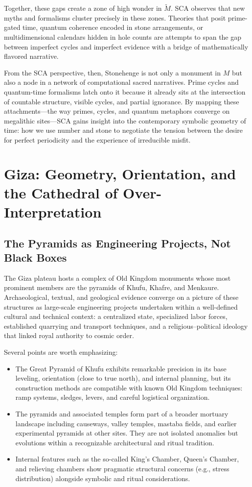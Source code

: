 \documentclass[12]{amsart}
\theoremstyle{plain}
\begin{document}
Together, these gaps create a zone of high wonder in $\tilde M$. SCA observes that new myths and formalisms cluster precisely in these zones. Theories that posit prime-gated time, quantum coherence encoded in stone arrangements, or multidimensional calendars hidden in hole counts are attempts to span the gap between imperfect cycles and imperfect evidence with a bridge of mathematically flavored narrative.

From the SCA perspective, then, Stonehenge is not only a monument in $M$ but also a node in a network of computational sacred narratives. Prime cycles and quantum-time formalisms latch onto it because it already sits at the intersection of countable structure, visible cycles, and partial ignorance. By mapping these attachments---the way primes, cycles, and quantum metaphors converge on megalithic sites---SCA gains insight into the contemporary symbolic geometry of time: how we use number and stone to negotiate the tension between the desire for perfect periodicity and the experience of irreducible misfit.


\section{Giza: Geometry, Orientation, and the Cathedral of Over-Interpretation}

\subsection{The Pyramids as Engineering Projects, Not Black Boxes}

The Giza plateau hosts a complex of Old Kingdom monuments whose most prominent members are the pyramids of Khufu, Khafre, and Menkaure. Archaeological, textual, and geological evidence converge on a picture of these structures as large-scale engineering projects undertaken within a well-defined cultural and technical context: a centralized state, specialized labor forces, established quarrying and transport techniques, and a religious–political ideology that linked royal authority to cosmic order.

Several points are worth emphasizing:

\begin{itemize}
  \item The Great Pyramid of Khufu exhibits remarkable precision in its base leveling, orientation (close to true north), and internal planning, but its construction methods are compatible with known Old Kingdom techniques: ramp systems, sledges, levers, and careful logistical organization.
  \item The pyramids and associated temples form part of a broader mortuary landscape including causeways, valley temples, mastaba fields, and earlier experimental pyramids at other sites. They are not isolated anomalies but evolutions within a recognizable architectural and ritual tradition.
  \item Internal features such as the so-called King's Chamber, Queen's Chamber, and relieving chambers show pragmatic structural concerns (e.g., stress distribution) alongside symbolic and ritual considerations.
\end{itemize}
\end{document}
